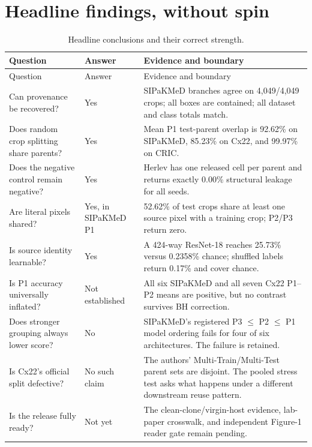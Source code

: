 \documentclass[11pt,oneside]{report}
\begin{document}
\section{Headline findings, without spin}

\begin{longtable}{p{}p{}p{}}
\caption{Headline conclusions and their correct strength.}\label{tab:headline}\\
\toprule
Question & Answer & Evidence and boundary \\
\midrule
\endfirsthead
\toprule
Question & Answer & Evidence and boundary \\
\midrule
\endhead
\bottomrule
\endfoot
Can provenance be recovered? & Yes & SIPaKMeD branches agree on 4,049/4,049 crops; all boxes are contained; all dataset and class totals match. \\
Does random crop splitting share parents? & Yes & Mean P1 test-parent overlap is 92.62\% on SIPaKMeD, 85.23\% on Cx22, and 99.97\% on CRIC. \\
Does the negative control remain negative? & Yes & Herlev has one released cell per parent and returns exactly 0.00\% structural leakage for all seeds. \\
Are literal pixels shared? & Yes, in SIPaKMeD P1 & 52.62\% of test crops share at least one source pixel with a training crop; P2/P3 return zero. \\
Is source identity learnable? & Yes & A 424-way ResNet-18 reaches 25.73\% versus 0.2358\% chance; shuffled labels return 0.17\% and cover chance. \\
Is P1 accuracy universally inflated? & Not established & All six SIPaKMeD and all seven Cx22 P1--P2 means are positive, but no contrast survives BH correction. \\
Does stronger grouping always lower score? & No & SIPaKMeD's registered P3 $\leq$ P2 $\leq$ P1 model ordering fails for four of six architectures. The failure is retained. \\
Is Cx22's official split defective? & No such claim & The authors' Multi-Train/Multi-Test parent sets are disjoint. The pooled stress test asks what happens under a different downstream reuse pattern. \\
Is the release fully ready? & Not yet & The clean-clone/virgin-host evidence, lab-paper crosswalk, and independent Figure-1 reader gate remain pending. \\
\end{longtable}
\end{document}
